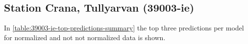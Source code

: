 \subsection{Station Crana, Tullyarvan (39003-ie)}
In \autoref{table:39003-ie-top-predictions-summary} the top three predictions per model for normalized and not not normalized data is shown.



